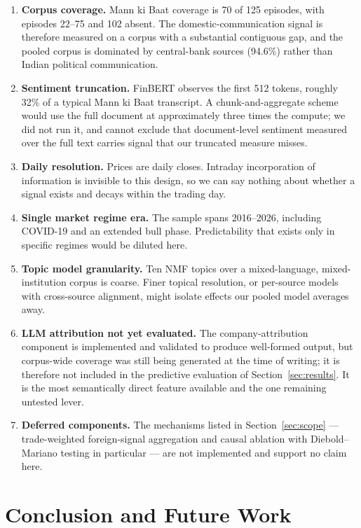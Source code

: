 \documentclass[11pt]{article}
\begin{document}
\begin{enumerate}[leftmargin=*, itemsep=2pt, topsep=4pt]
    \item \textbf{Corpus coverage.} Mann ki Baat coverage is 70 of 125 episodes, with episodes 22--75 and 102 absent. The domestic-communication signal is therefore measured on a corpus with a substantial contiguous gap, and the pooled corpus is dominated by central-bank sources (94.6\%) rather than Indian political communication.
    \item \textbf{Sentiment truncation.} FinBERT observes the first 512 tokens, roughly 32\% of a typical Mann ki Baat transcript. A chunk-and-aggregate scheme would use the full document at approximately three times the compute; we did not run it, and cannot exclude that document-level sentiment measured over the full text carries signal that our truncated measure misses.
    \item \textbf{Daily resolution.} Prices are daily closes. Intraday incorporation of information is invisible to this design, so we can say nothing about whether a signal exists and decays within the trading day.
    \item \textbf{Single market regime era.} The sample spans 2016--2026, including COVID-19 and an extended bull phase. Predictability that exists only in specific regimes would be diluted here.
    \item \textbf{Topic model granularity.} Ten NMF topics over a mixed-language, mixed-institution corpus is coarse. Finer topical resolution, or per-source models with cross-source alignment, might isolate effects our pooled model averages away.
    \item \textbf{LLM attribution not yet evaluated.} The company-attribution component is implemented and validated to produce well-formed output, but corpus-wide coverage was still being generated at the time of writing; it is therefore not included in the predictive evaluation of Section~\ref{sec:results}. It is the most semantically direct feature available and the one remaining untested lever.
    \item \textbf{Deferred components.} The mechanisms listed in Section~\ref{sec:scope} --- trade-weighted foreign-signal aggregation and causal ablation with Diebold--Mariano testing in particular --- are not implemented and support no claim here.
\end{enumerate}

\section{Conclusion and Future Work}
\label{sec:conclusion}
\end{document}
